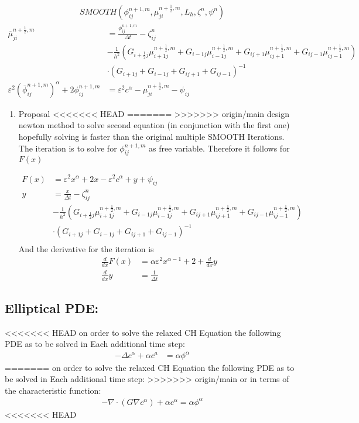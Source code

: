 \documentclass[11pt]{article}
\begin{document}
\begin{align*}
SMOOTH( \phi^{n+1,m}_{ij}, \mu^{n + \frac{1}{2},m}_{ji}, L_h , \zeta ^n , \psi ^n )
\end{align*}
\begin{align*}
\overline{\mu}^{n + \frac{1}{2},m}_{ji}
&=
  \frac{\phi ^{n+1,m}_{ij}}{\Delta t} - \zeta^n_{ij} \\
&- \frac{1}{h^2}(G_{i+\frac{1}{2}j} \mu^{n + \frac{1}{2},m}_{i+1j} +  G_{i-1j} \mu^{n + \frac{1}{2},m}_{i-1j} + G_{ij+1}  \mu^{n + \frac{1}{2},m}_{ij+1} + G_{ij-1} \mu^{n + \frac{1}{2},m}_{ij-1}) \\
&\cdot  (G_{i+1j} + G_{i-1j} + G_{ij+1} + G_{ij-1})^{-1} \\
 \varepsilon ^2 (\overline{\phi} ^{n+1,m}_{ij})^\alpha + 2 \phi ^{n+1,m}_{ij} &= \varepsilon ^2 c^\alpha  -\mu^{n + \frac{1}{2},m}_{ji}  - \psi_{ij}
\end{align*}
\begin{enumerate}
\item Proposal
<<<<<<< HEAD
\label{sec:orgf2731af}
=======
\label{sec:org644b61b}
>>>>>>> origin/main
design newton method to solve second equation (in conjunction with the first one) hopefully solving is faster than the original multiple SMOOTH Iterations.
 The iteration is to solve for \(\phi ^{n+1,m}_{ij}\) as free variable. Therefore it follows for \(F(x)\)

\begin{align*}
F(x)  &= \varepsilon ^2 x^\alpha + 2x - \varepsilon^2 c^\alpha  + y + \psi_{ij} \\
y &= \frac{x}{\Delta t} - \zeta^n_{ij} \\
&- \frac{1}{h^2}(G_{i+\frac{1}{2}j} \mu^{n + \frac{1}{2},m}_{i+1j} +  G_{i-1j} \mu^{n + \frac{1}{2},m}_{i-1j} + G_{ij+1}  \mu^{n + \frac{1}{2},m}_{ij+1} + G_{ij-1} \mu^{n + \frac{1}{2},m}_{ij-1}) \\
&\cdot  (G_{i+1j} + G_{i-1j} + G_{ij+1} + G_{ij-1})^{-1} \\
\end{align*}
And the derivative for the iteration is
\begin{align*}
\frac{d}{dx} F(x)&= \alpha \varepsilon^2 x^{\alpha-1} + 2 + \frac{d}{dx} y  \\
\frac{d}{dx} y  &= \frac{1}{\Delta t}
\end{align*}
\end{enumerate}
\subsection{Elliptical PDE:}
<<<<<<< HEAD
\label{sec:orgb36e4e9}
on order to solve the relaxed CH Equation the following PDE as to be solved in Each additional time step:
\begin{align*}
- \Delta c^\alpha  + \alpha c^a &= \alpha \phi ^\alpha
\end{align*}
=======
\label{sec:org2f4ef1c}
on order to solve the relaxed CH Equation the following PDE as to be solved in Each additional time step:
>>>>>>> origin/main
or in terms of the characteristic function:
\begin{align*}
- \nabla \cdot  (G \nabla c^\alpha) + \alpha c^\alpha  = \alpha \phi ^\alpha
\end{align*}
<<<<<<< HEAD
\end{document}
